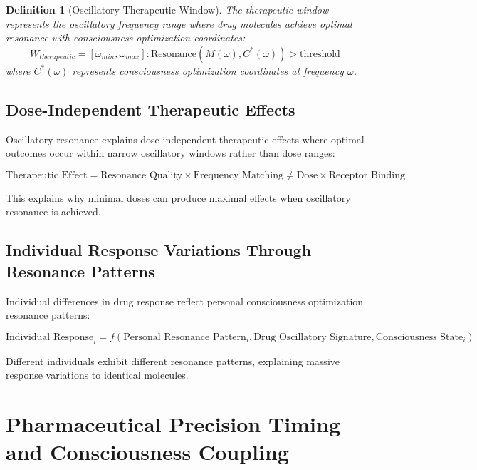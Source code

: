 \documentclass[12pt,a4paper]{article}
\newtheorem{definition}{Definition}
\begin{document}
\begin{definition}[Oscillatory Therapeutic Window]
The therapeutic window represents the oscillatory frequency range where drug molecules achieve optimal resonance with consciousness optimization coordinates:
\begin{equation}
W_{therapeutic} = [\omega_{min}, \omega_{max}] : \text{Resonance}(M(\omega), C^*(\omega)) > \text{threshold}
\end{equation}
where $C^*(\omega)$ represents consciousness optimization coordinates at frequency $\omega$.
\end{definition}

\subsection{Dose-Independent Therapeutic Effects}

Oscillatory resonance explains dose-independent therapeutic effects where optimal outcomes occur within narrow oscillatory windows rather than dose ranges:

\begin{equation}
\text{Therapeutic Effect} = \text{Resonance Quality} \times \text{Frequency Matching} \neq \text{Dose} \times \text{Receptor Binding}
\end{equation}

This explains why minimal doses can produce maximal effects when oscillatory resonance is achieved.

\subsection{Individual Response Variations Through Resonance Patterns}

Individual differences in drug response reflect personal consciousness optimization resonance patterns:

\begin{equation}
\text{Individual Response}_i = f(\text{Personal Resonance Pattern}_i, \text{Drug Oscillatory Signature}, \text{Consciousness State}_i)
\end{equation}

Different individuals exhibit different resonance patterns, explaining massive response variations to identical molecules.

\section{Pharmaceutical Precision Timing and Consciousness Coupling}
\end{document}
